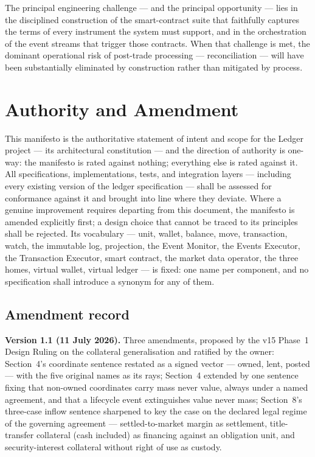 \documentclass[11pt,a4paper]{article}
\newcommand{\clabel}[1]{\leavevmode\hypertarget{clause-#1}{}%
  \marginpar{\raggedright\scriptsize\ttfamily\textcolor{gray}{#1}}}
\begin{document}
The principal engineering challenge --- and the principal opportunity
--- lies in the disciplined construction of the smart-contract suite
that faithfully captures the terms of every instrument the system must
support, and in the orchestration of the event streams that trigger
those contracts. When that challenge is met, the dominant operational
risk of post-trade processing --- reconciliation --- will have been
substantially eliminated by construction rather than mitigated by
process.

\hypertarget{authority-and-amendment}{%
\section{Authority and Amendment}\label{authority-and-amendment}}

\clabel{C-Auth.1}This manifesto is the authoritative statement of intent and scope for
the Ledger project --- its architectural constitution --- and the
direction of authority is one-way: the manifesto is rated against
nothing; everything else is rated against it. \clabel{C-Auth.2}All specifications,
implementations, tests, and integration layers --- including every
existing version of the ledger specification --- shall be assessed for
conformance against it and brought into line where they deviate. \clabel{C-Auth.3}Where a
genuine improvement requires departing from this document, the manifesto
is amended explicitly first; a design choice that cannot be traced to
its principles shall be rejected. \clabel{C-Auth.4}Its vocabulary --- unit, wallet,
balance, move, transaction, watch, the immutable log, projection, the
Event Monitor, the Events Executor, the Transaction Executor, smart
contract, the market data operator, the three homes, virtual wallet,
virtual ledger --- is fixed: one name per component, and no
specification shall introduce a synonym for any of them.

\subsection*{Amendment record}

\textbf{Version 1.1 (11 July 2026).} Three amendments, proposed by the
v15 Phase~1 Design Ruling on the collateral generalisation and ratified
by the owner: Section~4's coordinate sentence restated as a signed
vector --- owned, lent, posted --- with the five original names as its
rays; Section~4 extended by one sentence fixing that non-owned
coordinates carry mass never value, always under a named agreement, and
that a lifecycle event extinguishes value never mass; Section~8's
three-case inflow sentence sharpened to key the case on the declared
legal regime of the governing agreement --- settled-to-market margin as
settlement, title-transfer collateral (cash included) as financing
against an obligation unit, and security-interest collateral without
right of use as custody.
\end{document}
